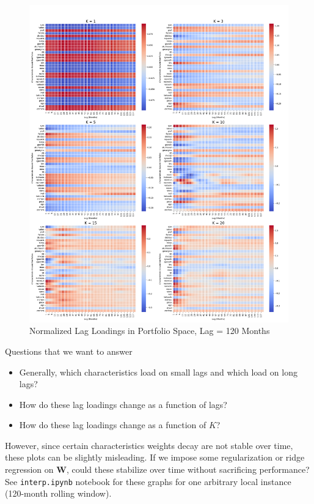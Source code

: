 \documentclass{article}
\begin{document}
\begin{figure}[H]
    \centering
    \includegraphics[width=1\linewidth]{WB_120_norm.png}
    \caption{Normalized Lag Loadings in Portfolio Space, Lag = 120 Months}
    \label{fig:WB_120_norm}
\end{figure}

Questions that we want to answer
\begin{itemize}
    \item Generally, which characteristics load on small lags and which load on long lags?
    \item How do these lag loadings change as a function of lags?
    \item How do these lag loadings change as a function of $K$?
\end{itemize}

However, since certain characteristics weights decay are not stable over time, 
these plots can be slightly misleading. If we impose some regularization or ridge regression on $\bm{W}$, 
could these stabilize over time without sacrificing performance? See \verb|interp.ipynb| 
notebook for these graphs for one arbitrary local instance (120-month rolling window).
\end{document}
